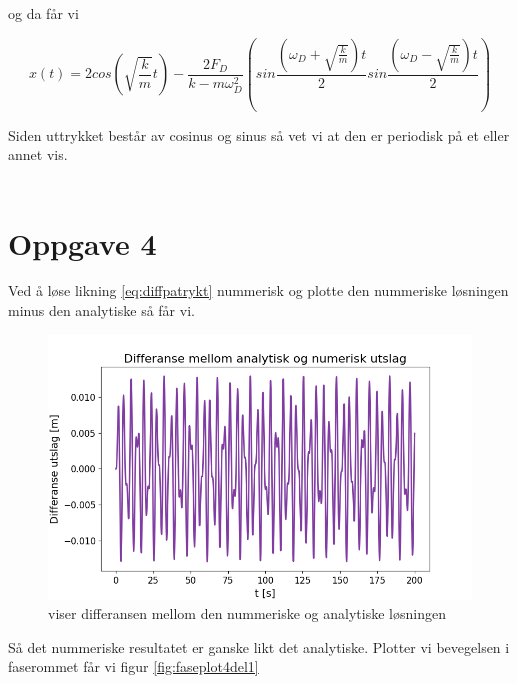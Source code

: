 \documentclass[norsk,a4paper,12pt]{article}
\begin{document}
og da får vi

\begin{equation}
	x(t) = 2 cos \left(\sqrt{\frac{k}{m}}t \right) - \frac{2F_D}{k-m\omega_D^2} \left(sin\frac{\left(\omega_D + \sqrt{\frac{k}{m}} \right)t}{2} sin\frac{\left(\omega_D - \sqrt{\frac{k}{m}} \right)t}{2} \right)
\end{equation}

Siden uttrykket består av cosinus og sinus så vet vi at den er periodisk på et eller annet vis.
\\
\\

\section*{Oppgave 4}
Ved å løse likning \ref{eq:diffpatrykt} nummerisk og plotte den nummeriske løsningen minus den analytiske så får vi.

\begin{figure}[H]
\begin{center}
\includegraphics[scale=0.5]{Oppgave4_differanse.png}
\caption{viser differansen mellom den nummeriske og analytiske løsningen}
\label{fig:differanseplot}
\end{center}
\end{figure}

Så det nummeriske resultatet er ganske likt det analytiske. Plotter vi bevegelsen i faserommet får vi figur \ref{fig:faseplot4del1}
\end{document}
